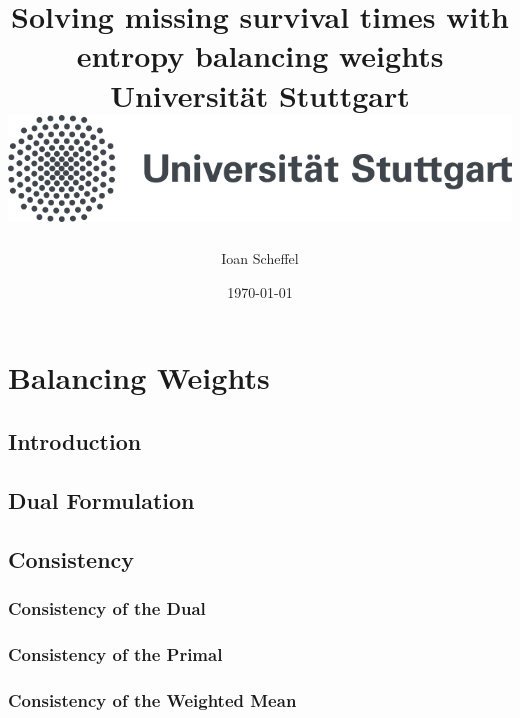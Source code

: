 \documentclass[11pt, a4paper, BCOR=10mm, DIV=11]{scrbook}
\title{
  {
    Solving missing survival times with entropy balancing weights
  }
  \\
  {\large Universität Stuttgart}
  \\
  {\includegraphics{unistuttgart_logo_deutsch.jpg}}
}
\author{Ioan Scheffel}
\date{\today}
\theoremstyle{definition}
\theoremstyle{plain}
\begin{document}
\listoftodos

\maketitle

\tableofcontents 

%
%

\chapter{Balancing Weights}
  \section{Introduction}
  
  \newpage
  \section{Dual Formulation}
  
  \newpage
  \section{Consistency}
  \subsection*{Consistency of the Dual}
  
  \subsection*{Consistency of the Primal}
  
  \subsection*{Consistency of the Weighted Mean}
  
\end{document}
